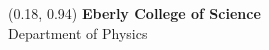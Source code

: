 \documentclass{../psuposter}
\begin{document}
\begin{frame}
\begin{textblock}{0.5}(0.18, 0.94)
    \color{white}
    \sffamily
    \textbf{Eberly College of Science}
    \\
    Department of Physics
\end{textblock}


\end{frame}
\end{document}
